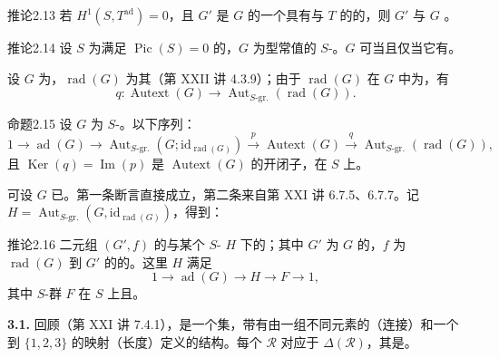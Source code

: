 \begin{SGAresult}{推论}{2.13}
若 $H^1(S,T^{\mathrm{ad}})=0$，且 $G'$ 是 $G$ 的一个具有与 $T$ 的的，则 $G'$ 与 $G$ 。
\end{SGAresult}
\begin{SGAresult}{推论}{2.14}
设 $S$ 为满足 $\operatorname{Pic}(S)=0$ 的，$G$ 为型常值的 $S$-。$G$ 可当且仅当它有。
\end{SGAresult}
设 $G$ 为，$\operatorname{rad}(G)$ 为其（第 XXII 讲 4.3.9）；由于 $\operatorname{rad}(G)$ 在 $G$ 中为，有
\[q:\operatorname{Autext}(G)\longrightarrow\operatorname{Aut}_{S\text{-gr.}}(\operatorname{rad}(G)).\]
\begin{SGAresult}{命题}{2.15}
设 $G$ 为 $S$-。以下序列：
\[1\longrightarrow\operatorname{ad}(G)\longrightarrow\operatorname{Aut}_{S\text{-gr.}}(G;\mathrm{id}_{\operatorname{rad}(G)})\xrightarrow p\operatorname{Autext}(G)\xrightarrow q\operatorname{Aut}_{S\text{-gr.}}(\operatorname{rad}(G)),\]
且 $\operatorname{Ker}(q)=\operatorname{Im}(p)$ 是 $\operatorname{Autext}(G)$ 的开闭子，在 $S$ 上。
\end{SGAresult}
可设 $G$ 已。第一条断言直接成立，第二条来自第 XXI 讲 6.7.5、6.7.7。记 $H=\operatorname{Aut}_{S\text{-gr.}}(G,\mathrm{id}_{\operatorname{rad}(G)})$，得到：
\begin{SGAresult}{推论}{2.16}
二元组 $(G',f)$ 的与某个 $S$- $H$ 下的；其中 $G'$ 为 $G$ 的，$f$ 为 $\operatorname{rad}(G)$ 到 $G'$ 的的。这里 $H$ 满足
\[1\longrightarrow\operatorname{ad}(G)\longrightarrow H\longrightarrow F\longrightarrow1,\]
其中 $S$-群 $F$ 在 $S$ 上且。
\end{SGAresult}
\textbf{3.1.} 回顾（第 XXI 讲 7.4.1），是一个集，带有由一组不同元素的（连接）和一个到 $\{1,2,3\}$ 的映射（长度）定义的结构。每个 $\mathcal R$ 对应于 $\Delta(\mathcal R)$，其是。
